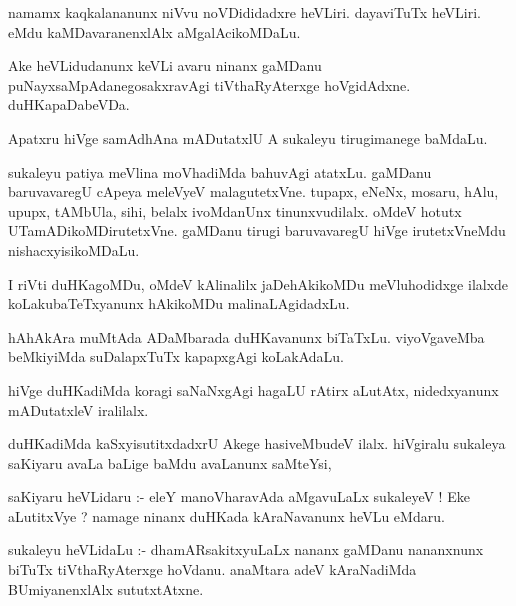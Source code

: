 \documentclass{article}
\begin{document}
\begin{mn}
namamx kaqkalananunx niVvu noVDididadxre heVLiri.  dayaviTuTx heVLiri.  
eMdu kaMDavaranenxlAlx aMgalAcikoMDaLu.
\end{mn}

\begin{mn}
Ake heVLidudanunx keVLi avaru ninanx gaMDanu puNayxsaMpAdanegosakxravAgi  
tiVthaRyAterxge hoVgidAdxne. duHKapaDabeVDa.
\end{mn}

\begin{mn}
Apatxru hiVge samAdhAna mADutatxlU  A sukaleyu tirugimanege baMdaLu.
\end{mn}

\begin{mn}
sukaleyu patiya meVlina moVhadiMda bahuvAgi atatxLu. gaMDanu baruvavaregU 
cApeya meleVyeV malagutetxVne.  tupapx, eNeNx, mosaru, hAlu, upupx, tAMbUla, 
sihi, belalx ivoMdanUnx tinunxvudilalx.  oMdeV hotutx UTamADikoMDirutetxVne.  
gaMDanu tirugi baruvavaregU hiVge irutetxVneMdu nishacxyisikoMDaLu.
\end{mn}

\begin{mn}
I riVti duHKagoMDu, oMdeV kAlinalilx jaDehAkikoMDu meVluhodidxge ilalxde 
koLakubaTeTxyanunx hAkikoMDu malinaLAgidadxLu.
\end{mn}

\begin{mn}
hAhAkAra muMtAda ADaMbarada duHKavanunx biTaTxLu.  viyoVgaveMba beMkiyiMda 
suDalapxTuTx kapapxgAgi koLakAdaLu.
\end{mn}

\begin{mn}
hiVge duHKadiMda koragi saNaNxgAgi hagaLU rAtirx aLutAtx, nidedxyanunx mADutatxleV iralilalx.
\end{mn}

\begin{mn}
duHKadiMda kaSxyisutitxdadxrU Akege hasiveMbudeV ilalx.  hiVgiralu sukaleya 
saKiyaru avaLa baLige baMdu avaLanunx saMteYsi,
\end{mn}

\begin{mn}
saKiyaru  heVLidaru :- eleY  manoVharavAda  aMgavuLaLx sukaleyeV !  Eke aLutitxVye ?  
namage ninanx duHKada kAraNavanunx heVLu eMdaru.
\end{mn}

\begin{mn}
sukaleyu  heVLidaLu :- dhamARsakitxyuLaLx nananx gaMDanu nananxnunx biTuTx 
tiVthaRyAterxge hoVdanu.  anaMtara adeV kAraNadiMda BUmiyanenxlAlx sututxtAtxne.
\end{mn}
\end{document}
